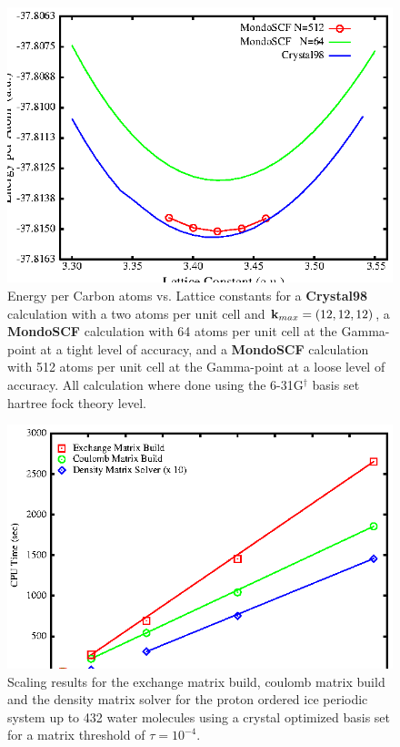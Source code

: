 \documentclass[prb,aps,nobibnotes,twocolumn,doublespace,twocolumngrid,superbib]{revtex4}
\begin{document}
%
%
%
\begin{figure}
\caption{Energy per Carbon atoms vs. Lattice constants for a {\bf Crystal98} calculation 
with a two atoms per unit
cell and ${\bf k}_{max} = (12,12,12)$, a {\bf MondoSCF} calculation with 64 atoms per
unit cell at the Gamma-point at a tight level of accuracy, and a {\bf MondoSCF} calculation 
with 512 atoms  per
unit cell at the Gamma-point at a loose level of accuracy.
All calculation where done using the 
6-31G$ ^\dagger$ basis set hartree fock theory level. }
\label{figure:EnergyVsLattice}
{\centering \includegraphics{Diamond_En_vs_a.ps} \par} 
\end{figure}
%
%
%
\begin{figure}
\caption{Scaling results for the exchange matrix build, coulomb matrix
build and the density matrix solver  for the proton ordered ice periodic system up to 432 water molecules 
using a crystal optimized basis set\cite{CBS:511G:H,CBS:861G:MgO} for a matrix threshold of $\tau=10^{-4}$.}
\label{figure:Scaling_Matrix_Build_Ice}
{\centering \includegraphics{Timing_pIce_ONX_1.ps} \par} 
\end{figure}
\end{document}
